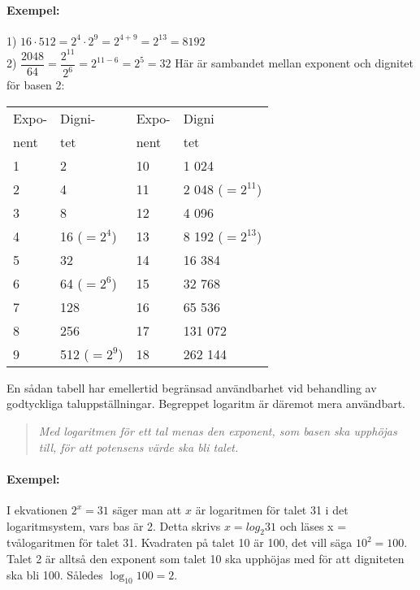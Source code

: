 \paragraph{Exempel:}
1) \(16 \cdot 512 = 2^4 \cdot 2^9 =2^{4+9} = 2^{13} = 8192\)\\
2) \(\dfrac{2048}{64} = \dfrac{2^{11}}{2^6} =2^{11-6} =2^5 = 32\)
Här är sambandet mellan exponent och dignitet för basen 2:

\begin{center}
\begin{tabular}{ll|ll}
Expo- & Digni-       & Expo- & Digni            \\
nent  & tet          & nent  & tet              \\ \hline
1     & 2            & 10    & 1 024            \\
2     & 4            & 11    & 2 048 (\(=2^{11}\)) \\
3     & 8            & 12    & 4 096            \\
4     & 16 (\(=2^4\))  & 13    & 8 192 (\(=2^{13}\)) \\
5     & 32           & 14    & 16 384           \\
6     & 64 (\(=2^6\))  & 15    & 32 768           \\
7     & 128          & 16    & 65 536           \\
8     & 256          & 17    & 131 072          \\
9     & 512 (\(=2^9\)) & 18    & 262 144
\end{tabular}
\end{center}

En sådan tabell har emellertid begränsad användbarhet vid behandling av
godtyckliga taluppställningar. Begreppet logaritm är däremot mera användbart.

\begin{quote}\emph{
Med logaritmen för ett tal menas den exponent, som basen ska upphöjas till,
för att potensens värde ska bli talet.
}\end{quote}

\paragraph{Exempel:}
I ekvationen \(2^x = 31\) säger man att \(x\) är logaritmen för talet 31 i det
logaritmsystem, vars bas är 2.
Detta skrivs \(x= log_2 31\) och läses x = tvålogaritmen för talet 31.
Kvadraten på talet 10 är 100, det vill säga \(10^2 = 100\).
Talet 2 är alltså den exponent som talet 10 ska upphöjas med för att digniteten
ska bli 100.
Således \(\log_{10}{100} = 2\).

